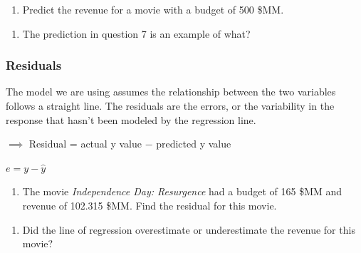 \documentclass[
]{report}
\providecommand{\tightlist}{%
  \setlength{\itemsep}{0pt}\setlength{\parskip}{0pt}}
\begin{document}
\vspace{.6in}

\begin{enumerate}
\def\labelenumi{\arabic{enumi}.}
\setcounter{enumi}{6}
\tightlist
\item
  Predict the revenue for a movie with a budget of 500 \$MM.
\end{enumerate}

\vspace{0.8in}

\begin{enumerate}
\def\labelenumi{\arabic{enumi}.}
\setcounter{enumi}{7}
\tightlist
\item
  The prediction in question 7 is an example of what?
\end{enumerate}

\vspace{0.3in}

\hypertarget{residuals}{%
\subsubsection*{Residuals}\label{residuals}}

The model we are using assumes the relationship between the two variables follows a straight line. The residuals are the errors, or the variability in the response that hasn't been modeled by the regression line.

\begin{center}

$\implies$ Residual = actual y value $-$ predicted y value

$e=y-\hat{y}$
\end{center}

\begin{enumerate}
\def\labelenumi{\arabic{enumi}.}
\setcounter{enumi}{8}
\tightlist
\item
  The movie \emph{Independence Day: Resurgence} had a budget of 165 \$MM and revenue of 102.315 \$MM. Find the residual for this movie.
\end{enumerate}

\vspace{.8in}

\begin{enumerate}
\def\labelenumi{\arabic{enumi}.}
\setcounter{enumi}{9}
\tightlist
\item
  Did the line of regression overestimate or underestimate the revenue for this movie?
\end{enumerate}
\end{document}
